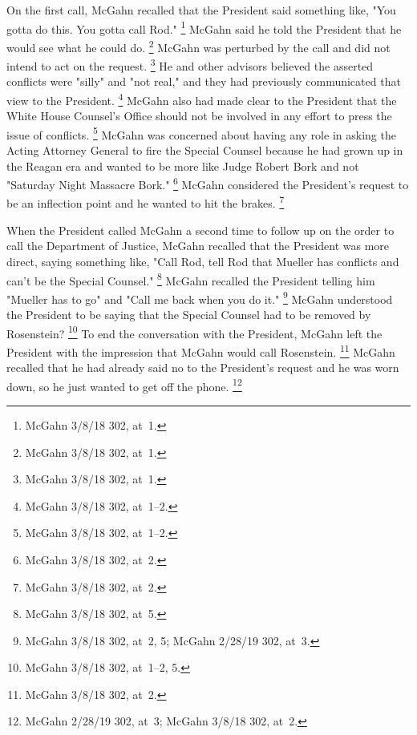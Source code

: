 On the first call, McGahn recalled that the President said something like, "You gotta do this.
You gotta call Rod."%
\footnote{McGahn 3/8/18 302, at~1.}
McGahn said he told the President that he would see what he could do.%
\footnote{McGahn 3/8/18 302, at~1.}
McGahn was perturbed by the call and did not intend to act on the request.%
\footnote{McGahn 3/8/18 302, at~1.}
He and other advisors believed the asserted conflicts were "silly" and "not real," and they had previously communicated that view to the President.%
\footnote{McGahn 3/8/18 302, at~1--2.}
McGahn also had made clear to the President that the White House Counsel's Office should not be involved in any effort to press the issue of conflicts.%
\footnote{McGahn 3/8/18 302, at~1--2.}
McGahn was concerned about having any role in asking the Acting Attorney General to fire the Special Counsel because he had grown up in the Reagan era and wanted to be more like Judge Robert Bork and not "Saturday Night Massacre Bork."%
\footnote{McGahn 3/8/18 302, at~2.}
McGahn considered the President's request to be an inflection point and he wanted to hit the brakes.%
\footnote{McGahn 3/8/18 302, at~2.}

When the President called McGahn a second time to follow up on the order to call the Department of Justice, McGahn recalled that the President was more direct, saying something like, "Call Rod, tell Rod that Mueller has conflicts and can't be the Special Counsel."%
\footnote{McGahn 3/8/18 302, at~5.}
McGahn recalled the President telling him "Mueller has to go" and "Call me back when you do it."%
\footnote{McGahn 3/8/18 302, at~2, 5;
McGahn 2/28/19 302, at~3.}
McGahn understood the President to be saying that the Special Counsel had to be removed by Rosenstein?%
\footnote{McGahn 3/8/18 302, at~1--2, 5.}
To end the conversation with the President, McGahn left the President with the impression that McGahn would call Rosenstein.%
\footnote{McGahn 3/8/18 302, at~2.}
McGahn recalled that he had already said no to the President's request and he was worn down, so he just wanted to get off the phone.%
\footnote{McGahn 2/28/19 302, at~3;
McGahn 3/8/18 302, at~2.}

